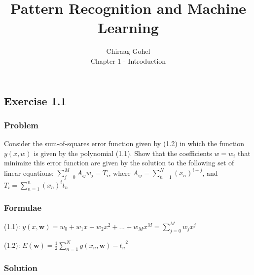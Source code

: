 \documentclass[12pt]{article}
\begin{document}
 
\title{Pattern Recognition and Machine Learning}
\author{Chiraag Gohel\\
Chapter 1 - Introduction}

\subsection*{Exercise 1.1} 

\subsubsection*{Problem}
Consider the sum-of-squares error function given by (1.2) in which the function $y(x,w)$ is given by the polynomial (1.1). Show that the coefficients $w = {w_i}$ that minimize this error function are given by the solution to the following set of linear equations: $\sum_{j=0}^M A_{ij}w_j = T_i$, where $A_{ij} = \sum_{n=1}^N (x_n)^{i+j}$, and $T_i = \sum_{n=1}^n (x_n)^i t_n$

\subsubsection*{Formulae}
(1.1): $y(x, \mathbf{w}) = w_0 + w_1x + w_2x^2 + ... + w_Mx^M = \sum_{j=0}^M w_jx^j$

(1.2): $E(\mathbf{w}) = \frac{1}{2}\sum_{n=1}^N {y(x_n, \mathbf{w}) - t_n}^2$

\subsubsection*{Solution}
\end{document}
